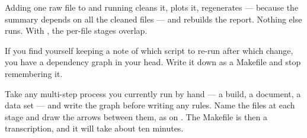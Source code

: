 \begin{eg}
	Adding one raw file to  and running  cleans it,
	plots it, regenerates  --- because the summary depends on all
	the cleaned files --- and rebuilds the report. Nothing else runs. With
	, the per-file stages overlap.
\end{eg}

\begin{moral}
	If you find yourself keeping a note of which script to re-run after which
	change, you have a dependency graph in your head. Write it down as a Makefile
	and stop remembering it.
\end{moral}

\begin{tryit}
	Take any multi-step process you currently run by hand --- a build, a document,
	a data set --- and write the graph before writing any rules. Name the files at
	each stage and draw the arrows between them, as on
	. The Makefile is then a transcription, and it will
	take about ten minutes.
\end{tryit}
